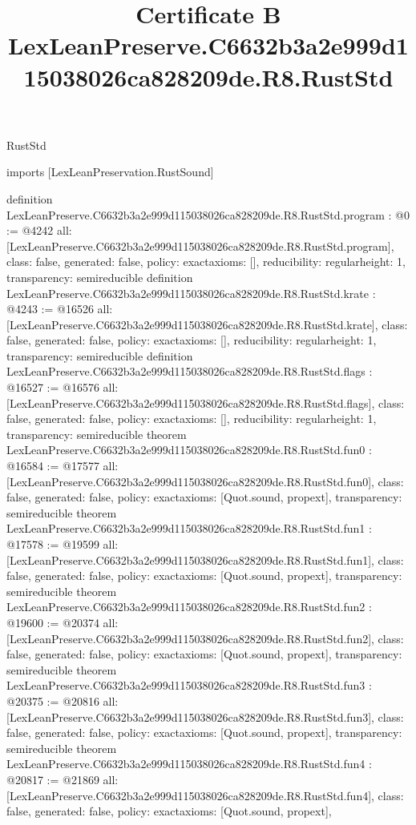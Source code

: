 \begin{lexlean}{RustStd}
\title{Certificate B LexLeanPreserve.C6632b3a2e999d115038026ca828209de.R8.RustStd}
\begin{coremodule}
imports [LexLeanPreservation.RustSound]

definition LexLeanPreserve.C6632b3a2e999d115038026ca828209de.R8.RustStd.program : @0 := @4242 {
  all: [LexLeanPreserve.C6632b3a2e999d115038026ca828209de.R8.RustStd.program],
  class: false,
  generated: false,
  policy: exact{axioms: []},
  reducibility: regular{height: 1},
  transparency: semireducible
}
definition LexLeanPreserve.C6632b3a2e999d115038026ca828209de.R8.RustStd.krate : @4243 := @16526 {
  all: [LexLeanPreserve.C6632b3a2e999d115038026ca828209de.R8.RustStd.krate],
  class: false,
  generated: false,
  policy: exact{axioms: []},
  reducibility: regular{height: 1},
  transparency: semireducible
}
definition LexLeanPreserve.C6632b3a2e999d115038026ca828209de.R8.RustStd.flags : @16527 := @16576 {
  all: [LexLeanPreserve.C6632b3a2e999d115038026ca828209de.R8.RustStd.flags],
  class: false,
  generated: false,
  policy: exact{axioms: []},
  reducibility: regular{height: 1},
  transparency: semireducible
}
theorem LexLeanPreserve.C6632b3a2e999d115038026ca828209de.R8.RustStd.fun0 : @16584 := @17577 {
  all: [LexLeanPreserve.C6632b3a2e999d115038026ca828209de.R8.RustStd.fun0],
  class: false,
  generated: false,
  policy: exact{axioms: [Quot.sound, propext]},
  transparency: semireducible
}
theorem LexLeanPreserve.C6632b3a2e999d115038026ca828209de.R8.RustStd.fun1 : @17578 := @19599 {
  all: [LexLeanPreserve.C6632b3a2e999d115038026ca828209de.R8.RustStd.fun1],
  class: false,
  generated: false,
  policy: exact{axioms: [Quot.sound, propext]},
  transparency: semireducible
}
theorem LexLeanPreserve.C6632b3a2e999d115038026ca828209de.R8.RustStd.fun2 : @19600 := @20374 {
  all: [LexLeanPreserve.C6632b3a2e999d115038026ca828209de.R8.RustStd.fun2],
  class: false,
  generated: false,
  policy: exact{axioms: [Quot.sound, propext]},
  transparency: semireducible
}
theorem LexLeanPreserve.C6632b3a2e999d115038026ca828209de.R8.RustStd.fun3 : @20375 := @20816 {
  all: [LexLeanPreserve.C6632b3a2e999d115038026ca828209de.R8.RustStd.fun3],
  class: false,
  generated: false,
  policy: exact{axioms: [Quot.sound, propext]},
  transparency: semireducible
}
theorem LexLeanPreserve.C6632b3a2e999d115038026ca828209de.R8.RustStd.fun4 : @20817 := @21869 {
  all: [LexLeanPreserve.C6632b3a2e999d115038026ca828209de.R8.RustStd.fun4],
  class: false,
  generated: false,
  policy: exact{axioms: [Quot.sound, propext]},
}
\end{coremodule}
\end{lexlean}
